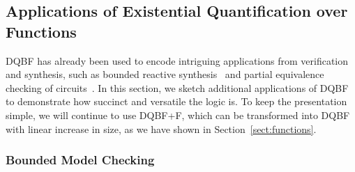 \documentclass{svjour3}
\begin{document}


%
%
%
%





\subsection{Applications of Existential Quantification over Functions}
\label{ssect:applications}

DQBF has already been used to encode intriguing applications from verification and synthesis, such as bounded reactive synthesis~\cite{FaymonvilleFinkbeinerRabeTentrup/2017/EncodingsOfBoundedSynthesis} and partial equivalence checking of circuits~\cite{GitinaReimerSauerWimmerSchollBecker/2012/PECusingDQBF}.
In this section, we sketch additional applications of DQBF to demonstrate how succinct and versatile the logic is.
To keep the presentation simple, we will continue to use DQBF+F, which can be transformed into DQBF with linear increase in size, as we have shown in Section~\ref{sect:functions}.

\subsubsection{Bounded Model Checking}
\end{document}

